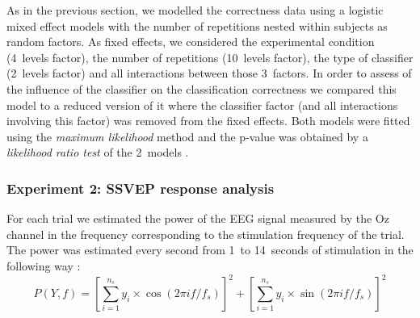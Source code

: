 \documentclass[10pt]{article}
\begin{document}
        As in the previous section, we modelled the correctness data using a logistic mixed effect models \parencite{Jaeger2008a} with the number of repetitions nested within subjects as random factors.
        As fixed effects, we considered the experimental condition (4~levels factor), the number of repetitions (10~levels factor), the type of classifier (2~levels factor) and all interactions between those 3~factors.
        In order to assess of the influence of the classifier on the classification correctness we compared this model to a reduced version of it where the classifier factor (and all interactions involving this factor) was removed from the fixed effects.
        Both models were fitted using the \emph{maximum likelihood} method and the p-value was obtained by a \emph{likelihood ratio test} of the 2~models \parencite{Pinheiro2000}.

%


        \subsubsection{Experiment 2: SSVEP response analysis}
        \label{sec:2.3.2AnalysisExp2}

        For each trial we estimated the power of the EEG signal measured by the Oz channel in the frequency corresponding to the stimulation frequency of the trial.
        The power was estimated every second from 1~to 14~seconds of stimulation in the following way \parencite{Friman.2007}:
        \begin{equation}
        P(Y,f) = \left[\sum_{i=1}^{n_s} y_i\times\cos(2\pi i f / f_s)\right]^2 + \left[\sum_{i=1}^{n_s} y_i\times\sin(2\pi i f / f_s)\right]^2
        \end{equation}
\end{document}
